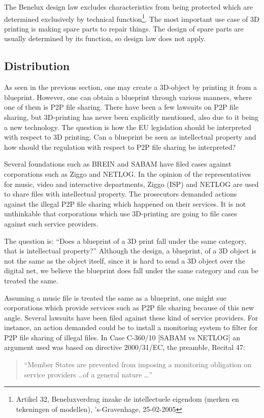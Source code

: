 The Benelux design law excludes characteristics from being protected which are determined exclusively by technical function\footnote{Artikel 32, Beneluxverdrag inzake de intellectuele eigendom (merken en tekeningen of modellen), 's-Gravenhage, 25-02-2005}.
The most important use case of 3D printing is making spare parts to repair things.
The design of spare parts are usually determined by its function, so design law does not apply.

\subsection{Distribution} %
As seen in the previous section, one may create a 3D-object by printing it from a blueprint. However, one can obtain a blueprint through various manners, where one of them is P2P file sharing. There have been a few lawsuits on P2P file sharing, but 3D-printing has never been explicitly mentioned, also due to it being a new technology. The question is how the EU legislation should be interpreted with respect to 3D printing. Can a blueprint be seen as intellectual property and how should the regulation with respect to P2P file sharing be interpreted?


Several foundations such as BREIN and SABAM have filed cases against corporations such as Ziggo and NETLOG. In the opinion of the representatives for music, video and interactive departments, Ziggo (ISP) and NETLOG are used to share files with intellectual property. The prosecutors demanded actions against the illegal P2P file sharing which happened on their services. It is not unthinkable that corporations which use 3D-printing are going to file cases against such service providers.

The question is: ``Does a blueprint of a 3D print fall under the same category, that is intellectual property?''
Although the design, a blueprint, of a 3D object is not the same as the object itself, since it is hard to send a 3D object over the digital net, we believe the blueprint does fall under the same category and can be treated the same.

Assuming a music file is treated the same as a blueprint, one might sue corporations which provide services such as P2P file sharing because of this new angle. Several lawsuits have been filed against these kind of service providers. For instance, an action demanded could be to install a monitoring system to filter for P2P file sharing of illegal files. In Case C-360/10 [SABAM vs NETLOG] an argument used was based on directive 2000/31/EC, the preamble, Recital 47: 
\begin{quote}``Member States are prevented from imposing a monitoring obligation on service providers \dots of a general nature \dots '' \end{quote}

